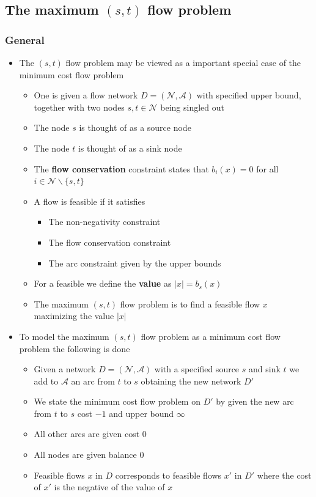 \documentclass[11pt]{article}
\begin{document}
\subsection{The maximum \((s,t)\) flow problem}
\label{sec:org02db5f4}
\subsubsection{General}
\label{sec:org8805d46}
\begin{itemize}
\item The \((s, t)\) flow problem may be viewed as a important special case of the minimum cost flow problem
\begin{itemize}
\item One is given a flow network \(D=(\mathcal N, \mathcal A)\) with specified upper bound, together with two nodes \(s,t \in \mathcal N\) being singled out
\item The node \(s\) is thought of as a source node
\item The node \(t\) is thought of as a sink node
\item The \textbf{flow conservation} constraint states that \(b_i(x) = 0\) for all \(i \in \mathcal N \backslash \{s,t\}\)
\item A flow is feasible if it satisfies
\begin{itemize}
\item The non-negativity constraint
\item The flow conservation constraint
\item The arc constraint given by the upper bounds
\end{itemize}
\item For a feasible we define the \textbf{value} as \(|x| = b_s(x)\)
\item The maximum \((s,t)\) flow problem is to find a feasible flow \(x\) maximizing the value \(|x|\)
\end{itemize}

\item To model the maximum \((s,t)\) flow problem as a minimum cost flow problem the following is done
\begin{itemize}
\item Given a network \(D=(\mathcal N, \mathcal A)\) with a specified source \(s\) and sink \(t\) we add to \(\mathcal A\) an arc from \(t\) to \(s\) obtaining the new network \(D'\)
\item We state the minimum cost flow problem on \(D'\) by given the new arc from \(t\) to \(s\) cost \(-1\) and upper bound \(\infty\)
\item All other arcs are given cost \(0\)
\item All nodes are given balance \(0\)
\item Feasible flows \(x\) in \(D\) corresponds to feasible flows \(x'\) in \(D'\) where the cost of \(x'\) is the negative of the value of \(x\)
\end{itemize}
\end{itemize}
\end{document}
